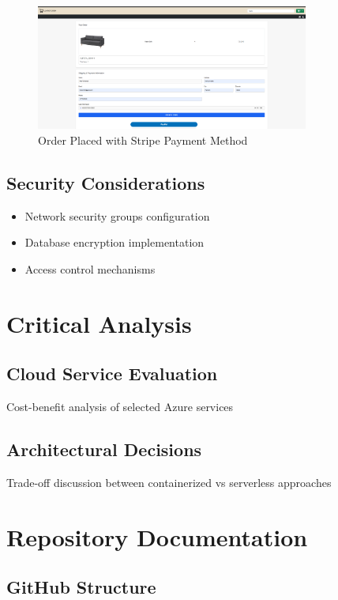 \documentclass{llncs}
\begin{document}
\begin{figure}[H]
    \centering
    \includegraphics[width=0.8\textwidth]{../images/Payment_Stripe.png}  %
    \vspace{3mm}  %
    \caption{Order Placed with Stripe Payment Method}
    \label{fig:Webshop_6}
\end{figure}

\subsection{Security Considerations}
\begin{itemize}
    \item Network security groups configuration
    \item Database encryption implementation
    \item Access control mechanisms
\end{itemize}

\section{Critical Analysis}
\subsection{Cloud Service Evaluation}
Cost-benefit analysis of selected Azure services
\subsection{Architectural Decisions}
Trade-off discussion between containerized vs serverless approaches

\section{Repository Documentation}
\subsection{GitHub Structure}
\end{document}
